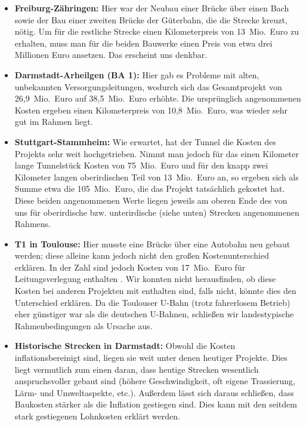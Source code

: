 \begin{itemize}

    \item \textbf{Freiburg-Zähringen:} Hier war der Neubau einer Brücke über einen Bach sowie der Bau einer zweiten Brücke der Güterbahn, die die Strecke kreuzt, nötig. Um für die restliche Strecke einen Kilometerpreis von 13{\ }Mio.{\ }Euro zu erhalten, muss man für die beiden Bauwerke einen Preis von etwa drei Millionen Euro ansetzen. Das erscheint uns denkbar.
    \item \textbf{Darmstadt-Arheilgen (BA 1):} Hier gab es Probleme mit alten, unbekannten Versorgungsleitungen, wodurch sich das Gesamtprojekt von 26,9{\ }Mio.{\ }Euro auf 38,5{\ }Mio.{\ }Euro erhöhte. Die ursprünglich angenommenen Kosten ergeben einen Kilometerpreis von 10,8{\ }Mio.{\ }Euro, was wieder sehr gut im Rahmen liegt.
    \item \textbf{Stuttgart-Stammheim:} Wie erwartet, hat der Tunnel die Kosten des Projekts sehr weit hochgetrieben. Nimmt man jedoch für das einen Kilometer lange Tunnelstück Kosten von 75{\ }Mio.{\ }Euro und für den knapp zwei Kilometer langen oberirdischen Teil von 13{\ }Mio.{\ }Euro an, so ergeben sich als Summe etwa die 105{\ }Mio.{\ }Euro, die das Projekt tatsächlich gekostet hat. Diese beiden angenommenen Werte liegen jeweils am oberen Ende des von uns für oberirdische bzw. unterirdische (siehe unten) Strecken angenommenen Rahmens.
    \item \textbf{T1 in Toulouse:} Hier musste eine Brücke über eine Autobahn neu gebaut werden; diese alleine kann jedoch nicht den großen Kostenunterschied erklären. In der Zahl sind jedoch Kosten von 17{\ }Mio.{\ }Euro für Leitungsverlegung enthalten \cite{tlsesv}. Wir konnten nicht herausfinden, ob diese Kosten bei anderen Projekten mit enthalten sind, falls nicht, könnte dies den Unterschied erklären. Da die Toulouser U-Bahn (trotz fahrerlosem Betrieb) eher günstiger war als die deutschen U-Bahnen, schließen wir landestypische Rahmenbedingungen als Ursache aus.
    \item \textbf{Historische Strecken in Darmstadt:} Obwohl die Kosten inflationsbereinigt sind, liegen sie weit unter denen heutiger Projekte. Dies liegt vermutlich zum einen daran, dass heutige Strecken wesentlich anspruchsvoller gebaut sind (höhere Geschwindigkeit, oft eigene Trassierung, Lärm- und Umweltaspekte, etc.). Außerdem lässt sich daraus schließen, dass Baukosten stärker als die Inflation gestiegen sind. Dies kann mit den seitdem stark gestiegenen Lohnkosten erklärt werden.

\end{itemize}

